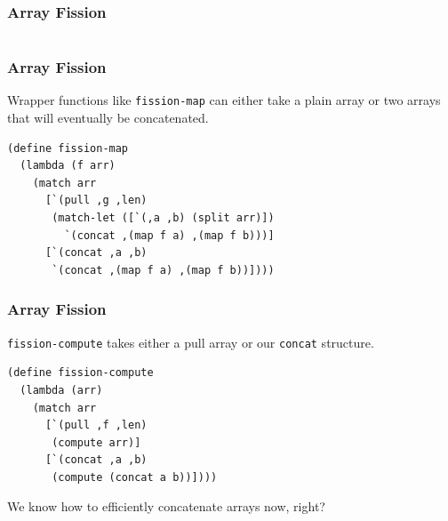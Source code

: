 \documentclass[12pt,letterpaper]{beamer}
\begin{document}
\begin{frame}[fragile]
\frametitle{Array Fission}
\begin{columns}[c]
\begin{column}[c]{5cm}

\end{column}
\begin{column}[c]{5cm}
\end{column}
\end{columns}
\end{frame}

\begin{frame}[fragile]
\frametitle{Array Fission}
Wrapper functions like {\tt fission-map} can either take
a plain array or two arrays that will eventually be concatenated.
\begin{lstlisting}
(define fission-map
  (lambda (f arr)
    (match arr
      [`(pull ,g ,len)
       (match-let ([`(,a ,b) (split arr)])
         `(concat ,(map f a) ,(map f b)))]
      [`(concat ,a ,b)
       `(concat ,(map f a) ,(map f b))])))
\end{lstlisting}
\end{frame}

\begin{frame}[fragile]
\frametitle{Array Fission}
{\tt fission-compute} takes either a pull array
or our {\tt concat} structure.
\begin{lstlisting}
(define fission-compute
  (lambda (arr)
    (match arr
      [`(pull ,f ,len)
       (compute arr)]
      [`(concat ,a ,b)
       (compute (concat a b))])))
\end{lstlisting}
We know how to efficiently concatenate arrays now, right?
\end{frame}
\end{document}
